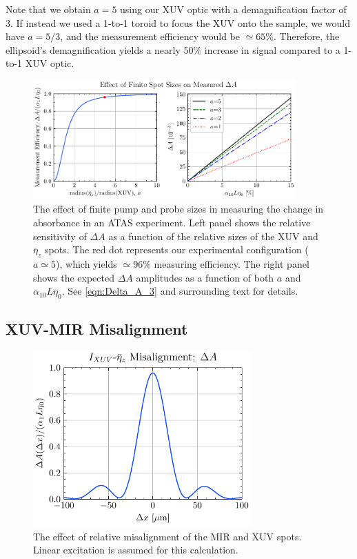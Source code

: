 Note that we obtain $a=5$ using our XUV optic with a demagnification factor of 3. If instead we used a 1-to-1 toroid to focus the XUV onto the sample, we would have $a=5/3$, and the measurement efficiency would be $\simeq 65\%$. Therefore, the ellipsoid's demagnification yields a nearly 50\% increase in signal compared to a 1-to-1 XUV optic.

\begin{figure}
	\centering
	\includegraphics[width=0.9\textwidth]{figures/chap4/Delta_A_curves.pdf}
	\caption{The effect of finite pump and probe sizes in measuring the change in absorbance in an ATAS experiment. Left panel shows the relative sensitivity of $\Delta A$ as a function of the relative sizes of the XUV and $\bar{\eta}_z$ spots. The red dot represents our experimental configuration ($a\simeq 5$), which yields $\simeq 96\%$ measuring efficiency. The right panel shows the expected $\Delta A$ amplitudes as a function of both $a$ and $\alpha_{10} L \eta_0$. See \cref{eqn:Delta_A_3} and surrounding text for details.}
	\label{fig:Delta_A_curve}
\end{figure}


\subsection{XUV-MIR Misalignment}

\begin{figure}
	\centering
	\includegraphics[width=0.75\textwidth]{figures/chap4/XUV_eta_misalignment.pdf}
	\caption{The effect of relative misalignment of the MIR and XUV spots. Linear excitation is assumed for this calculation.}
	\label{fig:XUV_eta_misalignment}
\end{figure}

